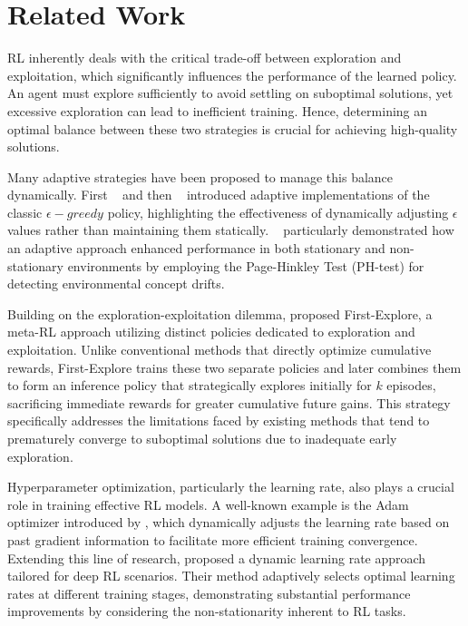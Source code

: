 
\section{Related Work}
\label{sec:related}

\ac{RL} inherently deals with the critical trade-off between exploration and exploitation, which significantly influences the performance of the learned policy. An agent must explore sufficiently to avoid settling on suboptimal solutions, yet excessive exploration can lead to inefficient training. Hence, determining an optimal balance between these two strategies is crucial for achieving high-quality solutions.~\cite{sutton98}

Many adaptive strategies have been proposed to manage this balance dynamically. First ~\citet{tokic2010} and then ~\citet{mignon2017adaptive} introduced adaptive implementations of the classic $\epsilon-greedy$ policy, highlighting the effectiveness of dynamically adjusting $\epsilon$ values rather than maintaining them statically. ~\citet{mignon2017adaptive} particularly demonstrated how an adaptive approach enhanced performance in both stationary and non-stationary environments by employing the Page-Hinkley Test (PH-test) for detecting environmental concept drifts.

Building on the exploration-exploitation dilemma, \citet{norman2024firstexploreexploitmetalearningsolve} proposed First-Explore, a meta-RL approach utilizing distinct policies dedicated to exploration and exploitation. Unlike conventional methods that directly optimize cumulative rewards, First-Explore trains these two separate policies and later combines them to form an inference policy that strategically explores initially for $k$ episodes, sacrificing immediate rewards for greater cumulative future gains. This strategy specifically addresses the limitations faced by existing methods that tend to prematurely converge to suboptimal solutions due to inadequate early exploration.

Hyperparameter optimization, particularly the learning rate, also plays a crucial role in training effective \ac{RL} models. A well-known example is the Adam optimizer introduced by \citet{kingma2017adammethodstochasticoptimization}, which dynamically adjusts the learning rate based on past gradient information to facilitate more efficient training convergence. Extending this line of research, \citet{dynamicrlalpha} proposed a dynamic learning rate approach tailored for deep \ac{RL} scenarios. Their method adaptively selects optimal learning rates at different training stages, demonstrating substantial performance improvements by considering the non-stationarity inherent to \ac{RL} tasks.

